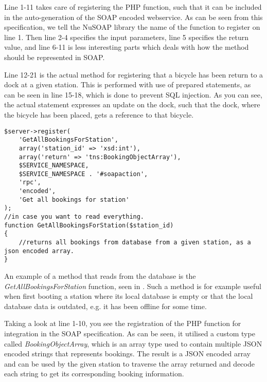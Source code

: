 Line 1-11 takes care of registering the PHP function, such that it can be included in the auto-generation of the SOAP encoded webservice.
As can be seen from this specification, we tell the NuSOAP library the name of the function to register on line 1.
Then line 2-4 specifies the input parameters, line 5 specifies the return value, and line 6-11 is less interesting parts which deals with how the method should be represented in SOAP.

Line 12-21 is the actual method for registering that a bicycle has been return to a dock at a given station.
This is performed with use of prepared statements, as can be seen in line 15-18, which is done to prevent SQL injection.
As you can see, the actual statement expresses an update on the dock, such that the dock, where the bicycle has been placed, gets a reference to that bicycle.

\begin{minipage}{\textwidth}
\begin{lstlisting}[caption = {Method for reading all bookings for a given station}, label = {lst:getallbookingstation}]
$server->register(
	'GetAllBookingsForStation',
	array('station_id' => 'xsd:int'),
	array('return' => 'tns:BookingObjectArray'),
	$SERVICE_NAMESPACE,
	$SERVICE_NAMESPACE . '#soapaction',
	'rpc',
	'encoded',
	'Get all bookings for station'
);
//in case you want to read everything.
function GetAllBookingsForStation($station_id)
{
	//returns all bookings from database from a given station, as a json encoded array.
}
\end{lstlisting}
\end{minipage}

An example of a method that reads from the database is the \textit{GetAllBookingsForStation} function, seen in .
Such a method is for example useful when first booting a station where its local database is empty or that the local database data is outdated, e.g. it has been offline for some time.

Taking a look at line 1-10, you see the registration of the PHP function for integration in the SOAP specification.
As can be seen, it utilised a custom type called \textit{BookingObjectArray}, which is an array type used to contain multiple JSON encoded strings that represents bookings.
The result is a JSON encoded array and can be used by the given station to traverse the array returned and decode each string to get its corresponding booking information.

